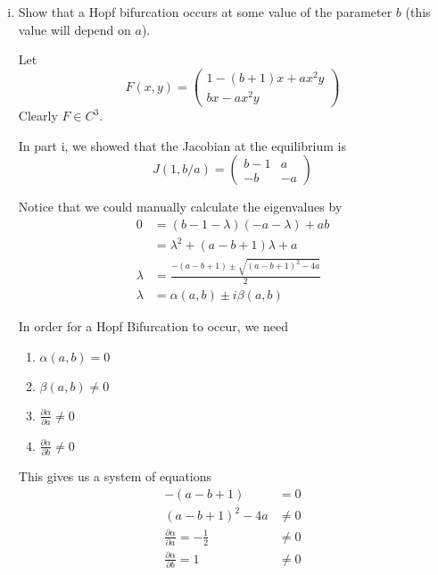 \documentclass[12pt]{article}
\begin{document}
\begin{enumerate}[(i)]
          \color{black}

    \item Show that a Hopf bifurcation occurs at some value of the parameter $b$ (this value will depend on $a$).

          \color{blue}
          Let
          \[F(x, y) = \begin{pmatrix}
                  1 - (b+1)x + ax^2y \\
                  b x - a x^2 y
              \end{pmatrix}\]
          Clearly $F \in C^3$.

          In part i, we showed that the Jacobian at the equilibrium is
          \[J(1, b/a) = \begin{pmatrix}
                  b-1 & a  \\
                  -b  & -a
              \end{pmatrix}\]

          Notice that we could manually calculate the eigenvalues by
          \begin{align*}
              0       & = (b - 1 - \lambda)(-a - \lambda) + ab                 \\
                      & = \lambda^2 + (a - b + 1)\lambda + a                   \\
              \lambda & = \frac{-(a - b + 1) \pm \sqrt{(a - b + 1)^2 - 4a}}{2} \\
              \lambda & = \alpha(a, b) \pm i \beta(a, b)
          \end{align*}

          In order for a Hopf Bifurcation to occur, we need
          \begin{enumerate}
              \item $\alpha(a, b) = 0$
              \item $\beta(a, b) \neq 0$
              \item $\frac{\partial \alpha}{\partial a} \neq 0$
              \item $\frac{\partial \alpha}{\partial b} \neq 0$
          \end{enumerate}

          This gives us a system of equations
          \begin{align}
              -(a - b + 1)                                      & = 0    \\
              (a - b+1)^2 - 4a                                  & \neq 0 \\
              \frac{\partial \alpha}{\partial a} = -\frac{1}{2} & \neq 0 \\
              \frac{\partial \alpha}{\partial b} = 1            & \neq 0
          \end{align}


\end{enumerate}
\end{document}
